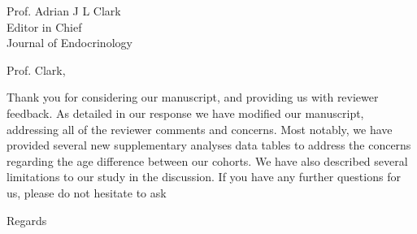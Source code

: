 \documentclass[a4paper,12pt]{letter}
\begin{document}
\begin{letter}{Prof. Adrian J L Clark \\
Editor in Chief\\
Journal of Endocrinology }

\opening{} %

Prof. Clark,

Thank you for considering our manuscript, and providing us with reviewer feedback.  As detailed in our response we have modified our manuscript, addressing all of the reviewer comments and concerns.  Most notably, we have provided several new supplementary analyses data tables to address the concerns regarding the age difference between our cohorts.  We have also described several limitations to our study in the discussion.  If you have any further questions for us, please do not hesitate to ask


\closing{Regards} %


\end{letter}
\end{document}

